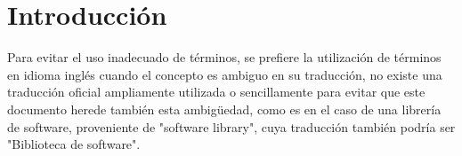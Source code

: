\section{Introducción}
Para evitar el uso inadecuado de términos, se prefiere la utilización de términos
en idioma inglés cuando el concepto es ambiguo en su traducción, no existe una
traducción oficial ampliamente utilizada o sencillamente para evitar que este
documento herede también esta ambigüedad, como es en el caso de una librería de software,
proveniente de "software library", cuya traducción también podría ser "Biblioteca
de software".